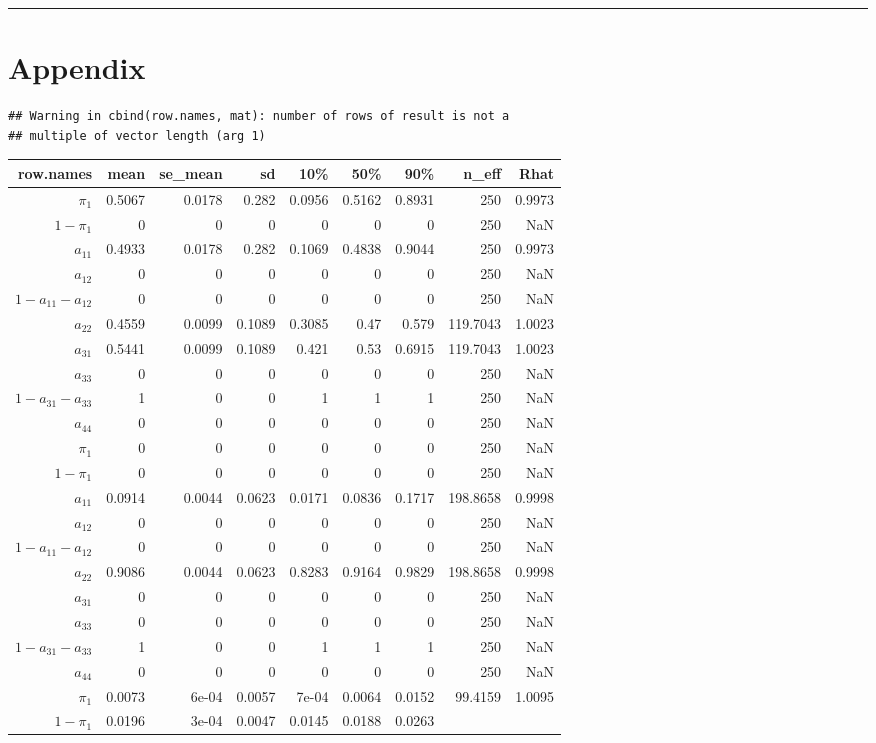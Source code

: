 \documentclass[]{article}
\begin{document}
\begin{center}\rule{0.5\linewidth}{\linethickness}\end{center}

\section{Appendix}\label{appendix}

\small

\begin{verbatim}
## Warning in cbind(row.names, mat): number of rows of result is not a
## multiple of vector length (arg 1)
\end{verbatim}

\begin{longtable}[]{@{}rrrrrrrrr@{}}
\toprule
row.names & mean & se\_mean & sd & 10\% & 50\% & 90\% & n\_eff &
Rhat\tabularnewline
\midrule
\endhead
\(\pi_{1}\) & 0.5067 & 0.0178 & 0.282 & 0.0956 & 0.5162 & 0.8931 & 250 &
0.9973\tabularnewline
\(1 - \pi_{1}\) & 0 & 0 & 0 & 0 & 0 & 0 & 250 & NaN\tabularnewline
\(a_{11}\) & 0.4933 & 0.0178 & 0.282 & 0.1069 & 0.4838 & 0.9044 & 250 &
0.9973\tabularnewline
\(a_{12}\) & 0 & 0 & 0 & 0 & 0 & 0 & 250 & NaN\tabularnewline
\(1 - a_{11} - a_{12}\) & 0 & 0 & 0 & 0 & 0 & 0 & 250 &
NaN\tabularnewline
\(a_{22}\) & 0.4559 & 0.0099 & 0.1089 & 0.3085 & 0.47 & 0.579 & 119.7043
& 1.0023\tabularnewline
\(a_{31}\) & 0.5441 & 0.0099 & 0.1089 & 0.421 & 0.53 & 0.6915 & 119.7043
& 1.0023\tabularnewline
\(a_{33}\) & 0 & 0 & 0 & 0 & 0 & 0 & 250 & NaN\tabularnewline
\(1 - a_{31} - a_{33}\) & 1 & 0 & 0 & 1 & 1 & 1 & 250 &
NaN\tabularnewline
\(a_{44}\) & 0 & 0 & 0 & 0 & 0 & 0 & 250 & NaN\tabularnewline
\(\pi_{1}\) & 0 & 0 & 0 & 0 & 0 & 0 & 250 & NaN\tabularnewline
\(1 - \pi_{1}\) & 0 & 0 & 0 & 0 & 0 & 0 & 250 & NaN\tabularnewline
\(a_{11}\) & 0.0914 & 0.0044 & 0.0623 & 0.0171 & 0.0836 & 0.1717 &
198.8658 & 0.9998\tabularnewline
\(a_{12}\) & 0 & 0 & 0 & 0 & 0 & 0 & 250 & NaN\tabularnewline
\(1 - a_{11} - a_{12}\) & 0 & 0 & 0 & 0 & 0 & 0 & 250 &
NaN\tabularnewline
\(a_{22}\) & 0.9086 & 0.0044 & 0.0623 & 0.8283 & 0.9164 & 0.9829 &
198.8658 & 0.9998\tabularnewline
\(a_{31}\) & 0 & 0 & 0 & 0 & 0 & 0 & 250 & NaN\tabularnewline
\(a_{33}\) & 0 & 0 & 0 & 0 & 0 & 0 & 250 & NaN\tabularnewline
\(1 - a_{31} - a_{33}\) & 1 & 0 & 0 & 1 & 1 & 1 & 250 &
NaN\tabularnewline
\(a_{44}\) & 0 & 0 & 0 & 0 & 0 & 0 & 250 & NaN\tabularnewline
\(\pi_{1}\) & 0.0073 & 6e-04 & 0.0057 & 7e-04 & 0.0064 & 0.0152 &
99.4159 & 1.0095\tabularnewline
\(1 - \pi_{1}\) & 0.0196 & 3e-04 & 0.0047 & 0.0145 & 0.0188 & 0.0263 &

\end{longtable}
\end{document}
